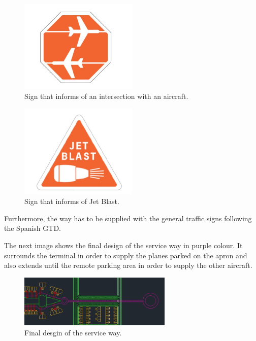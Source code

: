	\begin{figure}[H]
		\centering
		\includegraphics[clip, trim=0cm 0cm 0cm 0cm, width=0.5\textwidth]{./images/serviceway/sign1}
		\caption{Sign that informs of an intersection with an aircraft.} %
		\label{} %
	\end{figure} 
 	
 	\begin{figure}[H]
	\centering
	\includegraphics[clip, trim=0cm 0cm 0cm 0cm, width=0.5\textwidth]{./images/serviceway/sign2}
	\caption{Sign that informs of Jet Blast.} %
	\label{} %
	\end{figure} 
	
	
	Furthermore, the way has to be supplied with the general traffic signs following the Spanish GTD. 
	
	The next image shows the final design of the service way in purple colour. It surrounds the terminal in order to supply the planes parked on the apron and also extends until the remote parking area in order to supply the other aircraft.
	
	\begin{figure}[H]
		\centering
		\includegraphics[clip, trim=0cm 0cm 0cm 0cm, angle=90, width=0.65\textwidth]{./images/serviceway/serviceway}
		\caption{Final desgin of the service way.} %
		\label{} %
	\end{figure} 
	
